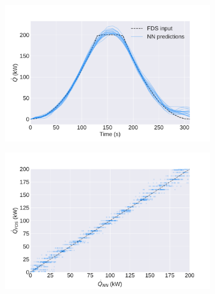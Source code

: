 \documentclass{article}
\begin{document}
\begin{figure}[htbp]
  \centering
  \begin{subfigure}[t]{.45\textwidth}
      \centering
      \includegraphics[width=\textwidth,keepaspectratio]{figures/backward_NN_examples.pdf}
      \caption{}
      \label{fig:backward_NN_examples}
  \end{subfigure}
  \begin{subfigure}[t]{.45\textwidth}
      \centering
      \includegraphics[width=\textwidth ,keepaspectratio]{figures/backward_error_scatter.pdf}
      \caption{}
      \label{fig:backward_error_scatter}
  \end{subfigure}
  \caption{} 
  \label{fig:backward_examples}
\end{figure}
\end{document}

